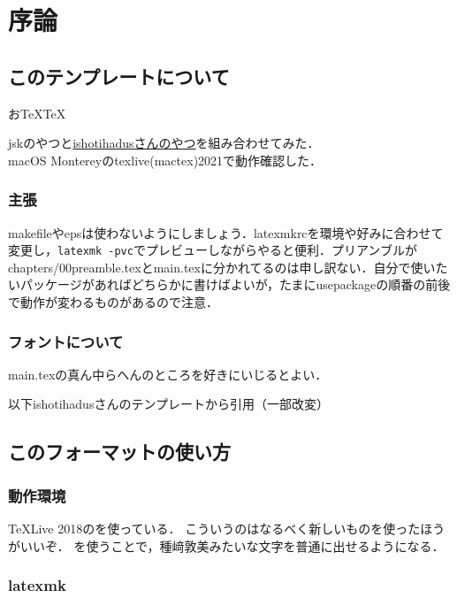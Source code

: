 %

\chapter{序論}
\label{chap:introduction}
\section{このテンプレートについて}
お\TeX\TeX\ \ \upLaTeX\ \ \pLaTeX
\par
jskのやつと\href{https://github.com/Ishotihadus/master-thesis-format}{ishotihadusさんのやつ}を組み合わせてみた．\\
macOS Montereyのtexlive(mactex)2021で動作確認した．
\subsection{主張}
makefileやepsは使わないようにしましょう．latexmkrcを環境や好みに合わせて変更し，\texttt{latexmk -pvc}でプレビューしながらやると便利．プリアンブルがchapters/00preamble.texとmain.texに分かれてるのは申し訳ない．自分で使いたいパッケージがあればどちらかに書けばよいが，たまにusepackageの順番の前後で動作が変わるものがあるので注意．
\subsection{フォントについて}
main.texの真ん中らへんのところを好きにいじるとよい．

以下ishotihadusさんのテンプレートから引用（一部改変）\\
\hrulefill
\section{このフォーマットの使い方}

\label{sec:02-hoge}

\subsection{動作環境}

\TeX Live 2018の\upLaTeX を使っている．
こういうのはなるべく新しいものを使ったほうがいいぞ．
\upLaTeX を使うことで，種﨑敦美みたいな文字を普通に出せるようになる．

\subsection{latexmk}

